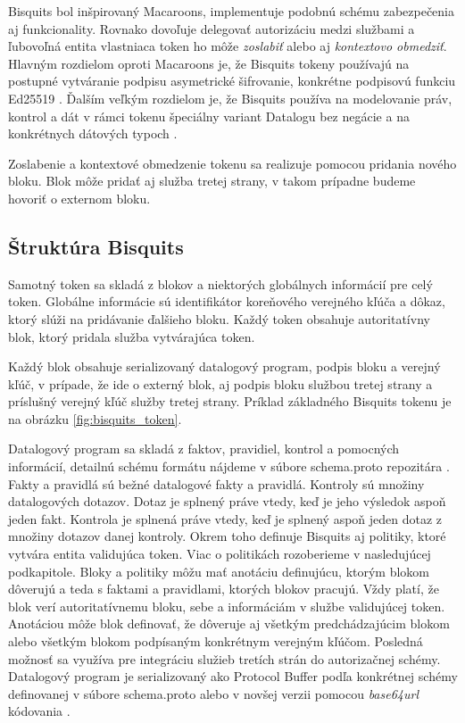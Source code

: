Bisquits bol inšpirovaný Macaroons, implementuje podobnú schému zabezpečenia aj funkcionality. Rovnako dovoľuje delegovať autorizáciu medzi službami a ľubovoľná entita vlastniaca token ho môže \textit{zoslabiť} alebo aj \textit{kontextovo obmedziť}. Hlavným rozdielom oproti Macaroons je, že Bisquits tokeny používajú na postupné vytváranie podpisu asymetrické šifrovanie, konkrétne podpisovú funkciu Ed25519 \cite{ed_rfc}. Ďalším veľkým rozdielom je, že Bisquits používa na modelovanie práv, kontrol a dát v rámci tokenu špeciálny variant Datalogu bez negácie a na konkrétnych dátových typoch \cite{datalog_bis}.

Zoslabenie a kontextové obmedzenie tokenu sa realizuje pomocou pridania nového bloku. Blok môže pridať aj služba tretej strany, v takom prípadne budeme hovoriť o externom bloku.

\subsection{Štruktúra Bisquits}

Samotný token sa skladá z blokov a niektorých globálnych informácií pre celý token. Globálne informácie sú identifikátor koreňového verejného kľúča a dôkaz, ktorý slúži na pridávanie ďalšieho bloku. Každý token obsahuje autoritatívny blok, ktorý pridala služba vytvárajúca token.

Každý blok obsahuje serializovaný datalogový program, podpis bloku a verejný kľúč, v prípade, že ide o externý blok, aj podpis bloku službou tretej strany a príslušný verejný kľúč služby tretej strany. Príklad základného Bisquits tokenu je na obrázku \ref{fig:bisquits_token}.

Datalogový program sa skladá z faktov, pravidiel, kontrol a pomocných informácií, detailnú schému formátu nájdeme v súbore schema.proto repozitára \cite{bisquits_git}. Fakty a pravidlá sú bežné datalogové fakty a pravidlá. Kontroly sú množiny datalogových dotazov. Dotaz je splnený práve vtedy, keď je jeho výsledok aspoň jeden fakt. Kontrola je splnená práve vtedy, keď je splnený aspoň jeden dotaz z množiny dotazov danej kontroly. Okrem toho definuje Bisquits aj politiky, ktoré vytvára entita validujúca token. Viac o politikách rozoberieme v nasledujúcej podkapitole. Bloky a politiky môžu mať anotáciu definujúcu, ktorým blokom dôverujú a teda s faktami a pravidlami, ktorých blokov pracujú. Vždy platí, že blok verí autoritatívnemu bloku, sebe a informáciám v službe validujúcej token. Anotáciou môže blok definovať, že dôveruje aj všetkým predchádzajúcim blokom alebo všetkým blokom podpísaným konkrétnym verejným kľúčom. Posledná možnosť sa využíva pre integráciu služieb tretích strán do autorizačnej schémy.
Datalogový program je serializovaný ako Protocol Buffer \cite{protobuf} podľa konkrétnej schémy definovanej v súbore schema.proto alebo v novšej verzii pomocou \textit{base64url} kódovania \cite{base64_rfc}.

